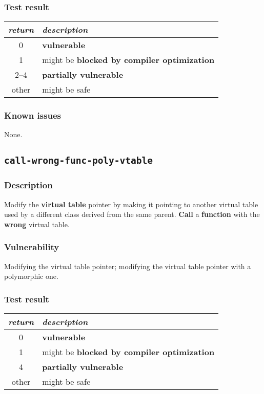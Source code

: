 \documentclass[a4paper]{book}
\begin{document}
\subsubsection{Test result}
\begin{tabular}{cl}
  \toprule
  \emph{return}  & \emph{description} \\
  \midrule
  0              & \textbf{vulnerable} \\
  1              & might be \textbf{blocked by compiler optimization} \\
  2--4           & \textbf{partially vulnerable} \\
  other          & might be safe \\
  \bottomrule
\end{tabular}
  
\subsubsection{Known issues}

None.

\newpage


\subsection{\texttt{call-wrong-func-poly-vtable}}\label{test-call-wrong-func-poly-vtable}

\subsubsection{Description}
Modify the \textbf{virtual table} pointer by making it pointing to another virtual table used by a different class derived from the same parent.
\textbf{Call} a \textbf{function} with the \textbf{wrong} virtual table.

\subsubsection{Vulnerability}
Modifying the virtual table pointer; modifying the virtual table pointer with a polymorphic one.

\subsubsection{Test result}
\begin{tabular}{cl}
  \toprule
  \emph{return}  & \emph{description} \\
  \midrule
  0              & \textbf{vulnerable} \\
  1              & might be \textbf{blocked by compiler optimization} \\
  4              & \textbf{partially vulnerable} \\
  other          & might be safe \\
  \bottomrule
\end{tabular}
  
\end{document}
